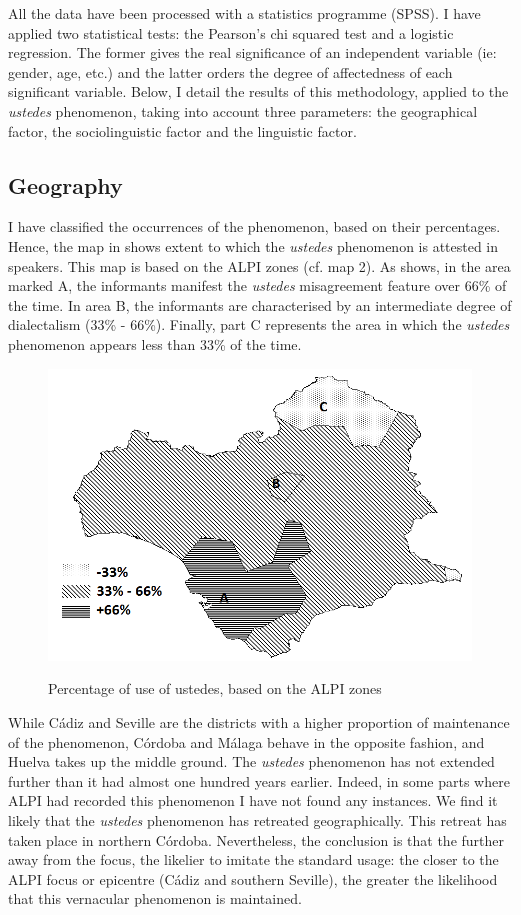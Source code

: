 \documentclass[output=paper]{LSP/langsci}
\begin{document}
All the data have been processed with a statistics programme (SPSS). I have applied two statistical tests: the Pearson’s chi squared test and a logistic regression. The former gives the real significance of an independent variable (ie: gender, age, etc.) and the latter orders the degree of affectedness of each significant variable. Below, I detail the results of this methodology, applied to the \textit{ustedes} phenomenon, taking into account three parameters: the geographical factor, the sociolinguistic factor and the linguistic factor.

\subsection{Geography}
I have classified the occurrences of the phenomenon, based on their percentages. Hence, the map in  shows extent to which the  \textit{ustedes} phenomenon is attested in speakers. This map is based on the ALPI zones (cf. map 2). As  shows, in the area marked A, the informants manifest the \textit{ustedes} misagreement feature over 66\% of the time. In area B, the informants are characterised by an intermediate degree of dialectalism (33\% - 66\%). Finally, part C represents the area in which the \textit{ustedes} phenomenon appears less than 33\% of the time.

\begin{figure}
\includegraphics[width=\textwidth]{illustrations/lara_fig3}
\label{fig:3}
\caption{Percentage of use of ustedes, based on the ALPI zones}
\end{figure}

While Cádiz and Seville are the districts with a higher proportion of maintenance of the phenomenon, Córdoba and Málaga behave in the opposite fashion, and Huelva takes up the middle ground. The \textit{ustedes} phenomenon has not extended further than it had almost one hundred years earlier. Indeed, in some parts where ALPI had recorded this phenomenon I have not found any instances. We find it likely that the \textit{ustedes} phenomenon has retreated geographically. This retreat has taken place in northern Córdoba. Nevertheless, the conclusion is that the further away from the focus, the likelier to imitate the standard usage: the closer to the ALPI focus or epicentre (Cádiz and southern Seville), the greater the likelihood that this vernacular phenomenon is maintained. 
\end{document}
